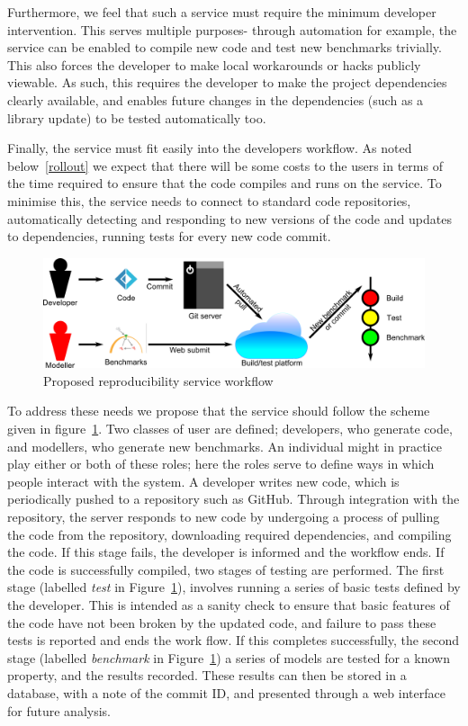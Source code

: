 \documentclass{llncs}
\begin{document}
Furthermore, we feel that such a service must require the minimum developer intervention.
This serves multiple purposes- through automation for example, the service can be enabled to compile 
new code and test new benchmarks trivially. This also forces the developer to make local
workarounds or hacks publicly viewable. As such, this requires the developer to make the 
project dependencies clearly available, and enables future changes in the dependencies 
(such as a library update) to be tested automatically too. 

Finally, the service must fit easily into the developers workflow. As noted below~\ref{rollout}
we expect that there will be some costs to the users in terms of the time required
to ensure that the code compiles and runs on the service. To minimise this, the service
needs to connect to standard code repositories, automatically detecting and responding to
new versions of the code and updates to dependencies, running tests for every new code commit.

\begin{figure}[!ht]
	\centering
	\includegraphics[width=\textwidth]{workflow}
	\caption{Proposed reproducibility service workflow}
	\label{schematic}
\end{figure}
	
To address these needs we propose that the service should follow the scheme given in 
figure~\ref{schematic}. Two classes of user are defined; developers, who generate code, 
and modellers, who generate new benchmarks. An individual might in practice play either
or both of these roles; here the roles serve to define ways in which people interact with
the system. A developer writes new code, which is periodically pushed to a repository 
such as GitHub. Through integration with the repository, the server responds to new 
code by undergoing a process of pulling the code from the repository, downloading 
required dependencies, and compiling the code. If this stage fails, the developer is 
informed and the workflow ends. If the code is successfully compiled, two stages of 
testing are performed. The first stage (labelled {\emph{test}} in Figure~\ref{schematic}), involves
running a series of basic tests defined by the developer. This is intended as a sanity check 
to ensure that basic features of the code have not been broken by the updated code, and 
failure to pass these tests is reported and ends the work flow. If this completes successfully,
the second stage (labelled {\emph{benchmark}} in Figure~\ref{schematic}) a series of models are 
tested for a known property, and the results recorded. These results can then be stored
in a database, with a note of the commit ID, and presented through a web interface for 
future analysis. 
\end{document}
